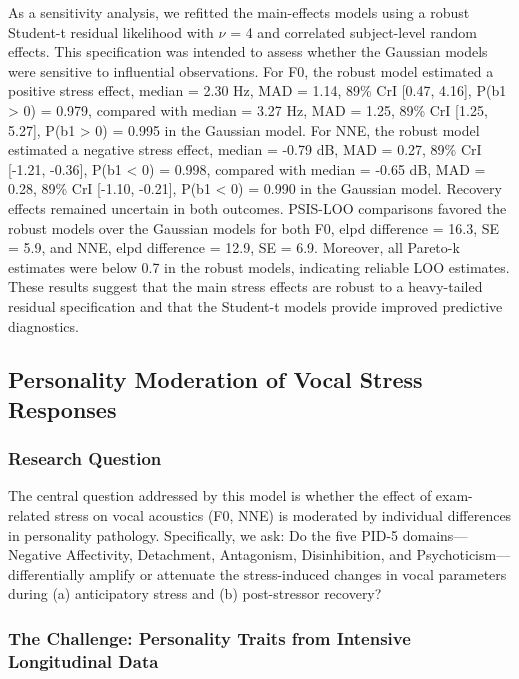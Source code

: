 \documentclass[
  english,
  man,floatsintext]{apa6}
\begin{document}
As a sensitivity analysis, we refitted the main-effects models using a robust Student-t residual likelihood with \(\nu\) = 4 and correlated subject-level random effects. This specification was intended to assess whether the Gaussian models were sensitive to influential observations. For F0, the robust model estimated a positive stress effect, median = 2.30 Hz, MAD = 1.14, 89\% CrI {[}0.47, 4.16{]}, P(b1 \textgreater{} 0) = 0.979, compared with median = 3.27 Hz, MAD = 1.25, 89\% CrI {[}1.25, 5.27{]}, P(b1 \textgreater{} 0) = 0.995 in the Gaussian model. For NNE, the robust model estimated a negative stress effect, median = -0.79 dB, MAD = 0.27, 89\% CrI {[}-1.21, -0.36{]}, P(b1 \textless{} 0) = 0.998, compared with median = -0.65 dB, MAD = 0.28, 89\% CrI {[}-1.10, -0.21{]}, P(b1 \textless{} 0) = 0.990 in the Gaussian model. Recovery effects remained uncertain in both outcomes. PSIS-LOO comparisons favored the robust models over the Gaussian models for both F0, elpd difference = 16.3, SE = 5.9, and NNE, elpd difference = 12.9, SE = 6.9. Moreover, all Pareto-k estimates were below 0.7 in the robust models, indicating reliable LOO estimates. These results suggest that the main stress effects are robust to a heavy-tailed residual specification and that the Student-t models provide improved predictive diagnostics.

\subsection{Personality Moderation of Vocal Stress Responses}\label{personality-moderation-of-vocal-stress-responses}

\subsubsection{Research Question}\label{research-question-1}

The central question addressed by this model is whether the effect of exam-related stress on vocal acoustics (F0, NNE) is moderated by individual differences in personality pathology. Specifically, we ask: Do the five PID-5 domains---Negative Affectivity, Detachment, Antagonism, Disinhibition, and Psychoticism---differentially amplify or attenuate the stress-induced changes in vocal parameters during (a) anticipatory stress and (b) post-stressor recovery?

\subsubsection{The Challenge: Personality Traits from Intensive Longitudinal Data}\label{the-challenge-personality-traits-from-intensive-longitudinal-data}
\end{document}
